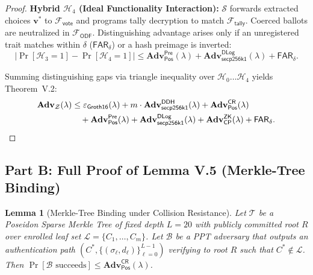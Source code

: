 \documentclass[10pt,letterpaper,journal]{IEEEtran}
\newtheorem{lemma}[theorem]{Lemma}
\begin{document}
\begin{proof}
\textbf{Hybrid $\mathcal{H}_4$ (Ideal Functionality Interaction):} $\mathcal{S}$ forwards extracted choices $\mathbf{v}^\ast$ to $\mathcal{F}_{\mathsf{vote}}$ and programs tally decryption to match $\mathcal{F}_{\mathsf{tally}}$. Coerced ballots are neutralized in $\mathcal{F}_{\mathsf{ODF}}$. Distinguishing advantage arises only if an unregistered trait matches within $\delta$ ($\mathsf{FAR}_\delta$) or a hash preimage is inverted:
\begin{equation}
  |\Pr[\mathcal{H}_3 = 1] - \Pr[\mathcal{H}_4 = 1]| \leq \mathbf{Adv}_{\mathsf{Pos}}^{\mathsf{Pre}}(\lambda) + \mathbf{Adv}_{\mathsf{secp256k1}}^{\mathsf{DLog}}(\lambda) + \mathsf{FAR}_\delta.
\end{equation}

Summing distinguishing gaps via triangle inequality over $\mathcal{H}_0 \dots \mathcal{H}_4$ yields Theorem~V.2:
\begin{align}
  \mathbf{Adv}_{\mathcal{Z}}(\lambda) &\leq \varepsilon_{\mathsf{Groth16}}(\lambda) + m \cdot \mathbf{Adv}_{\mathsf{secp256k1}}^{\mathsf{DDH}}(\lambda) + \mathbf{Adv}_{\mathsf{Pos}}^{\mathsf{CR}}(\lambda) \notag \\
  &\quad + \mathbf{Adv}_{\mathsf{Pos}}^{\mathsf{Pre}}(\lambda) + \mathbf{Adv}_{\mathsf{secp256k1}}^{\mathsf{DLog}}(\lambda) + \mathbf{Adv}_{\mathsf{CP}}^{\mathsf{ZK}}(\lambda) + \mathsf{FAR}_\delta. \label{eq:supp-main-uc-bound}
\end{align}
\end{proof}

\subsection{Part B: Full Proof of Lemma V.5 (Merkle-Tree Binding)}
\label{sec:supp-proof-merkle-binding}

\begin{lemma}[Merkle-Tree Binding under Collision Resistance]
\label{lem:supp-merkle-binding}
Let $\mathcal{T}$ be a Poseidon Sparse Merkle Tree of fixed depth $L=20$ with publicly committed root $R$ over enrolled leaf set $\mathcal{L} = \{C_1,\ldots,C_m\}$. Let $\mathcal{B}$ be a PPT adversary that outputs an authentication path $(C^\ast, \{(\sigma_\ell, d_\ell)\}_{\ell=0}^{L-1})$ verifying to root $R$ such that $C^\ast \notin \mathcal{L}$. Then $\Pr[\mathcal{B}\text{ succeeds}] \leq \mathbf{Adv}^{\mathsf{CR}}_{\mathsf{Pos}}(\lambda)$.
\end{lemma}
\end{document}
